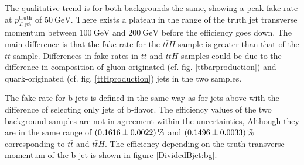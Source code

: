 %
The qualitative trend is for both backgrounds the same, showing a peak fake rate at $p_{T,\text{jet}}^{\text{truth}}$ of $\SI{50}{\giga\electronvolt}$. There exists a plateau in the range of the truth jet transverse momentum between $\SI{100}{\giga\electronvolt}$ and $\SI{200}{\giga\electronvolt}$ before the efficiency goes down. The main difference is that the fake rate for the $t\bar{t}H$ sample is greater than that of the $t\bar{t}$ sample. Differences in fake rates in $t\bar{t}$ and $t\bar{t}H$ samples could be due to the difference in composition of gluon-originated (cf. fig. \ref{ttbarproduction}) and quark-originated (cf. fig. \ref{ttHproduction}) jets in the two samples.\par
The fake rate for b-jets is defined in the same way as for jets above with the difference of selecting only jets of b-flavor. The efficiency values of the two background samples are not in agreement within the uncertainties, Although they are in the same range of $\SI{0.1616\pm 0.0022}{\percent}$ and $\SI{0.1496\pm 0.0033}{\percent}$ corresponding to $t\bar{t}$ and $t\bar{t}H$. The efficiency depending on the truth transverse momentum of the b-jet is shown in figure \ref{DividedBjet:bg}.
%
